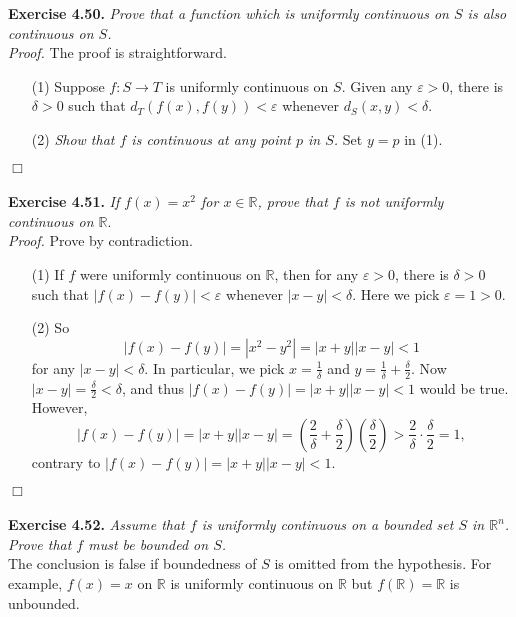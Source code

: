 \documentclass{article}
\begin{document}
\textbf{Exercise 4.50.}
\emph{Prove that a function which is uniformly continuous on $S$
is also continuous on $S$.} \\

\emph{Proof.}
The proof is straightforward.
\begin{enumerate}
\item[(1)]
Suppose $f: S \rightarrow T$ is uniformly continuous on $S$.
Given any $\varepsilon > 0$, there is $\delta > 0$ such that
$d_T(f(x), f(y)) < \varepsilon$ whenever $d_S(x, y) < \delta$.
\item[(2)]
\emph{Show that $f$ is continuous at any point $p$ in $S$.}
Set $y = p$ in (1).
\end{enumerate}
$\Box$ \\\\



\textbf{Exercise 4.51.}
\emph{If $f(x) = x^2$ for $x \in \mathbb{R}$,
prove that $f$ is not uniformly continuous on $\mathbb{R}$}. \\

\emph{Proof.}
Prove by contradiction.
\begin{enumerate}
\item[(1)]
If $f$ were uniformly continuous on $\mathbb{R}$,
then for any $\varepsilon > 0$, there is $\delta > 0$ such that
$|f(x) - f(y)| < \varepsilon$ whenever $|x - y| < \delta$.
Here we pick $\varepsilon = 1 > 0$.
\item[(2)]
So
$$|f(x) - f(y)| = |x^2 - y^2| = |x+y||x-y| < 1$$
for any $|x-y| < \delta$.
In particular, we pick $x = \frac{1}{\delta}$
and $y = \frac{1}{\delta} + \frac{\delta}{2}$.
Now $|x-y| = \frac{\delta}{2} < \delta$, and thus $|f(x) - f(y)| = |x+y||x-y| < 1$
would be true.
However,
$$|f(x) - f(y)| = |x+y||x-y|
= \left(\frac{2}{\delta}+ \frac{\delta}{2}\right)
\left(\frac{\delta}{2}\right)
> \frac{2}{\delta} \cdot \frac{\delta}{2} = 1,$$
contrary to $|f(x) - f(y)| = |x+y||x-y| < 1$.
\end{enumerate}
$\Box$ \\\\



\textbf{Exercise 4.52.}
\emph{Assume that $f$ is uniformly continuous on a bounded set $S$ in $\mathbb{R}^n$.
Prove that $f$ must be bounded on $S$.} \\

The conclusion is false if boundedness of $S$ is omitted from the hypothesis.
For example, $f(x) = x$ on $\mathbb{R}$ is uniformly continuous on $\mathbb{R}$
but $f(\mathbb{R}) = \mathbb{R}$ is unbounded. \\
\end{document}
